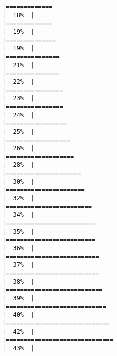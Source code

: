 \documentclass[
]{article}
\begin{document}
\begin{verbatim}
|=============                                                         |  18%  |                                                                              |=============                                                         |  19%  |                                                                              |==============                                                        |  19%  |                                                                              |===============                                                       |  21%  |                                                                              |===============                                                       |  22%  |                                                                              |================                                                      |  23%  |                                                                              |================                                                      |  24%  |                                                                              |=================                                                     |  25%  |                                                                              |==================                                                    |  26%  |                                                                              |===================                                                   |  28%  |                                                                              |=====================                                                 |  30%  |                                                                              |======================                                                |  32%  |                                                                              |========================                                              |  34%  |                                                                              |=========================                                             |  35%  |                                                                              |=========================                                             |  36%  |                                                                              |==========================                                            |  37%  |                                                                              |==========================                                            |  38%  |                                                                              |===========================                                           |  39%  |                                                                              |============================                                          |  40%  |                                                                              |=============================                                         |  42%  |                                                                              |==============================                                        |  43%  |                                                                              
\end{verbatim}
\end{document}
